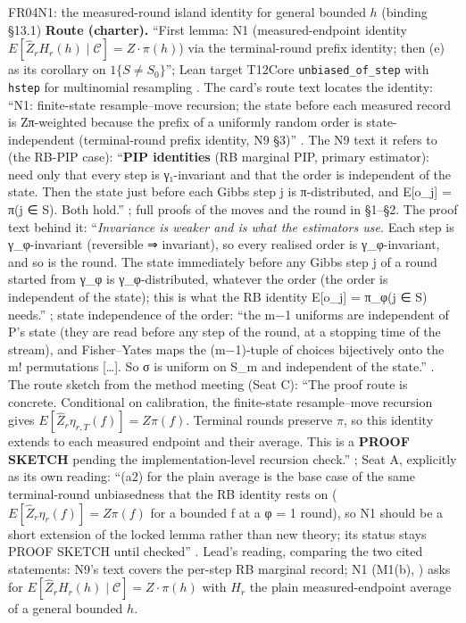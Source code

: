 \begin{card}{FR04}{N1: the measured-round island identity for general bounded $h$ (binding §13.1)}
\textbf{Route (charter).} ``First lemma: N1 (measured-endpoint identity $E[\hat Z_r H_r(h)\mid\mathcal{C}]=Z\cdot\pi(h)$) via the terminal-round prefix identity; then (e) as its corollary on $1\{S\neq S_0\}$''; Lean target T12Core \texttt{unbiased\_of\_step} with \texttt{hstep} for multinomial resampling . The card's route text locates the identity: ``N1: finite-state resample–move recursion; the state before each measured record is Zπ-weighted because the prefix of a uniformly random order is state-independent (terminal-round prefix identity, N9 §3)'' . The N9 text it refers to (the RB-PIP case): ``\textbf{PIP identities} (RB marginal PIP, primary estimator): need only that every step is γ₁-invariant and that the order is independent of the state. Then the state just before each Gibbs step j is π-distributed, and E[o\_j] = π(j ∈ S). Both hold.'' ; full proofs of the moves and the round in  §1--§2. The proof text behind it: ``\emph{Invariance is weaker and is what the estimators use.} Each step is γ\_φ-invariant (reversible ⇒ invariant), so every realised order is γ\_φ-invariant, and so is the round. The state immediately before any Gibbs step j of a round started from γ\_φ is γ\_φ-distributed, whatever the order (the order is independent of the state); this is what the RB identity E[o\_j] = π\_φ(j ∈ S) needs.'' ; state independence of the order: ``the m−1 uniforms are independent of P's state (they are read before any step of the round, at a stopping time of the stream), and Fisher–Yates maps the (m−1)-tuple of choices bijectively onto the m! permutations [\ldots]. So σ is uniform on S\_m and independent of the state.'' . The route sketch from the method meeting (Seat C): ``The proof route is concrete. Conditional on calibration, the finite-state resample–move recursion gives $E[\widehat Z_r\eta_{r,T}(f)]=Z\pi(f)$. Terminal rounds preserve $\pi$, so this identity extends to each measured endpoint and their average. This is a \textbf{PROOF SKETCH} pending the implementation-level recursion check.'' ; Seat A, explicitly as its own reading: ``(a2) for the plain average is the base case of the same terminal-round unbiasedness that the RB identity rests on ($E[\hat Z_r\eta_r(f)] = Z\pi(f)$ for a bounded f at a φ = 1 round), so N1 should be a short extension of the locked lemma rather than new theory; its status stays PROOF SKETCH until checked'' . Lead's reading, comparing the two cited statements: N9's text covers the per-step RB marginal record; N1 (M1(b), ) asks for $E[\hat Z_r H_r(h)\mid\mathcal C]=Z\cdot\pi(h)$ with $H_r$ the plain measured-endpoint average of a general bounded $h$.


\end{card}
